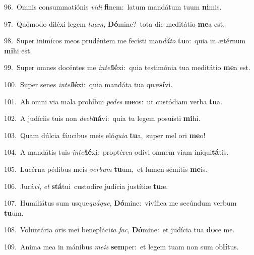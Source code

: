 {\numbfont\textcolor{\numbcolor}{96.}}~Omnis consummatiónis \textit{vi}\-\textit{di} \textbf{fi}\-nem:~\star latum mandátum tuum \textbf{ni}\-mis.\par
{\numbfont\textcolor{\numbcolor}{97.}}~Quómodo diléxi legem \textit{tu}\-\textit{am}, \textbf{Dó}\-mine?~\star tota die meditátio \textbf{me}\-a est.\par
{\numbfont\textcolor{\numbcolor}{98.}}~Super inimícos meos prudéntem me fecísti man\-\textit{dá}\-\textit{to} \textbf{tu}\-o:~\star quia in ætérnum \textbf{mi}\-hi est.\par
{\numbfont\textcolor{\numbcolor}{99.}}~Super omnes docéntes me \textit{in}\-\textit{tel}\textbf{lé}xi:~\star quia testimónia tua meditátio \textbf{me}\-a est.\par
{\numbfont\textcolor{\numbcolor}{100.}}~Super senes \textit{in}\-\textit{tel}\textbf{lé}xi:~\star quia mandáta tua quæ\-\textbf{sí}\-vi.\par
{\numbfont\textcolor{\numbcolor}{101.}}~Ab omni via mala prohíbui \textit{pe}\-\textit{des} \textbf{me}\-os:~\star ut custódiam verba \textbf{tu}\-a.\par
{\numbfont\textcolor{\numbcolor}{102.}}~A judíciis tuis non \textit{de}\-\textit{cli}\textbf{ná}vi:~\star quia tu legem posuísti \textbf{mi}\-hi.\par
{\numbfont\textcolor{\numbcolor}{103.}}~Quam dúlcia fáucibus meis eló\-\textit{qui}\-\textit{a} \textbf{tu}\-a,~\star super mel ori \textbf{me}\-o!\par
{\numbfont\textcolor{\numbcolor}{104.}}~A mandátis tuis \textit{in}\-\textit{tel}\textbf{lé}xi:~\star proptérea odívi omnem viam iniqui\-\textbf{tá}\-tis.\par
{\numbfont\textcolor{\numbcolor}{105.}}~Lucérna pédibus meis \textit{ver}\-\textit{bum} \textbf{tu}\-um,~\star et lumen sémitis \textbf{me}\-is.\par
{\numbfont\textcolor{\numbcolor}{106.}}~Jurá\-\textit{vi}\-, \textit{et} \textbf{stá}\-tui~\star custodíre judícia justítiæ \textbf{tu}\-æ.\par
{\numbfont\textcolor{\numbcolor}{107.}}~Humiliátus sum usque\-\textit{quá}\-\textit{que}, \textbf{Dó}\-mine:~\star vivífica me secúndum verbum \textbf{tu}\-um.\par
{\numbfont\textcolor{\numbcolor}{108.}}~Voluntária oris mei benepláci\textit{ta} \textit{fac}\-, \textbf{Dó}\-mine:~\star et judícia tua \textbf{do}\-ce me.\par
{\numbfont\textcolor{\numbcolor}{109.}}~Anima mea in mánibus \textit{me}\-\textit{is} \textbf{sem}\-per:~\star et legem tuam non sum ob\-\textbf{lí}\-tus.\par

